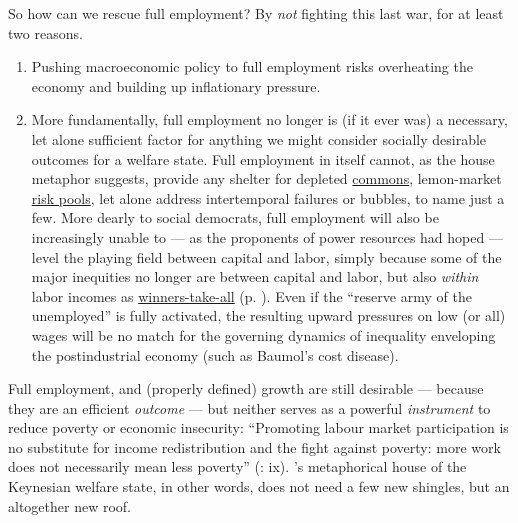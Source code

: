 \begin{description}
	So how can we rescue full employment? By \emph{not} fighting this last war, for at least two reasons.
	
	\begin{enumerate}
		\item Pushing macroeconomic policy to full employment risks overheating the economy and building up inflationary pressure.
		\item More fundamentally, full employment no longer is (if it ever was) a necessary, let alone sufficient factor for anything we might consider socially desirable outcomes for a welfare state. Full employment in itself cannot, as the house metaphor suggests, provide any shelter for depleted \hyperref[sec:commongood]{commons}, lemon-market \hyperref[sec:adverseselection]{risk pools}, let alone address intertemporal failures or bubbles, to name just a few. More dearly to social democrats, full employment will also be increasingly unable to --- as the proponents of power resources had hoped --- level the playing field between capital and labor, simply because some of the major inequities no longer are between capital and labor, but also \emph{within} labor incomes as \hyperref[sec:winner-take-all]{winners-take-all} (p. \pageref{sec:winner-take-all}). Even if the ``reserve army of the unemployed'' is fully activated, the resulting upward pressures on low (or all) wages will be no match for the governing dynamics of inequality enveloping the postindustrial economy (such as Baumol's cost disease). 	
	\end{enumerate}
	
	Full employment, and (properly defined) growth are still desirable --- because they are an efficient \emph{outcome} --- but neither serves as a powerful \emph{instrument} to reduce poverty or economic insecurity: ``Promoting labour market participation is no substitute for income redistribution and the fight against poverty: more work does not necessarily mean less poverty'' (\citealt{Esping-Andersen2002}: ix). \citeauthor{Offe2003}'s metaphorical house of the Keynesian welfare state, in other words, does not need a few new shingles, but an altogether new roof. 
	

\end{description}
